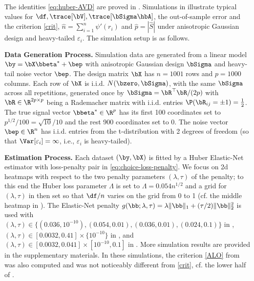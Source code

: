 \documentclass{colt2022} %
\def\eps{\varepsilon}
\numberwithin{equation}{section}
\begin{document}
\begin{table}[ht]
    \centering
    \setlength{\tabcolsep}{3pt}
    
    \vspace{2mm}
    \caption{Simulation for Huber Elastic-Net regression under different choices of $(\lambda, \tau)$. 
    $(n,p) = (1001,1000)$.
    For each choice of $(\lambda, \tau)$, 
    600 data points are simulated with anisotropic design matrix
    and i.i.d. $t$-distributed noises with 2 degrees of freedom.
A detailed setup is provided in .
    }
    \label{tab:table1}
\end{table}

The identities \eqref{eq:huber-AVD} are proved in \cite[\S2.6]{bellec2020out_of_sample}.
Simulations in  
illustrate typical values
for $\df,\trace[\bV],\trace[\bSigma\hbA]$,
the out-of-sample error and the criterion \eqref{crit},
$\hat n = \sum_{i=1}^n \psi'(r_i)$
and $\hat p =|\hat S|$
under anisotropic Gaussian design and heavy-tailed $\eps_i$.
The simulation setup is as follows.

\textbf{Data Generation Process.}
Simulation data are generated from a linear model $\by = \bX \bbeta^* + \bep $ 
with anisotropic Gaussian design $\bSigma$ and heavy-tail noise vector $\bep$.
The design matrix $\bX$ has $n = 1001$ rows 
and $p = 1000$ columns.
Each row of $\bX$ is i.i.d. $N(\bzero, \bSigma)$,
with the same $\bSigma$ across all repetitions, generated once
by $\bSigma = \bR^{\top}\bR / (2p)$
with $\bR \in \R^{2p \times p}$ being a Rademacher matrix with i.i.d. entries $\P(\bR_{ij} = \pm 1)=\frac12$.
The true signal vector $\bbeta^* \in \R^{p}$ has its first 100 coordinates set to $ p^{1/2} / 100 = \sqrt{10}/10$ and the rest 900 coordinates set to $0$.
The noise vector $\bep \in \R^{n}$ has i.i.d. entries from the t-distribution with 2 degrees of freedom (so that $\Var[\eps_i]=\infty$, i.e., $\eps_i$ is heavy-tailed).

\textbf{Estimation Process.}
Each dataset $(\by, \bX)$
is fitted by a Huber Elastic-Net estimator
with loss-penalty pair in \eqref{eq:choice-loss-penalty}.
We focus on 2d heatmaps with respect to the two penalty parameters
$(\lambda,\tau)$ of the penalty; to this end
the Huber loss parameter $\Lambda$ is set to $\Lambda = 0.054 n^{1/2}$
and a grid for $(\lambda,\tau)$ in then set so that
$\df/n$ varies on the grid from 0 to 1 (cf. the middle heatmap in
).
The Elastic-Net penalty $g(\bb;\lambda, \tau) = \lambda \| \bb \|_{1} + (\tau / 2) \| \bb \|_{2}^{2}$ 
is used with 
$(\lambda, \tau) \in \{ (0.036, 10^{-10}), (0.054, 0.01), (0.036, 0.01), (0.024, 0.1)\}$ in ,
$(\lambda, \tau) \in [0.0032, 0.41] \times \{10 ^{-10}\}$ in ,
and $(\lambda, \tau) \in [0.0032, 0.041] \times [10^{-10}, 0.1]$ in .
More simulation results are provided in the supplementary materials. 
In these simulations, the criterion \eqref{ALO} from \cite{rad2020scalable}
was also computed and was not noticeably different from \eqref{crit},
cf. the lower half of .
\end{document}
